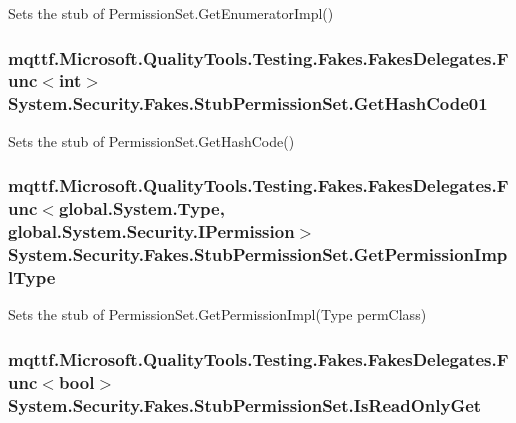 Sets the stub of Permission\-Set.\-Get\-Enumerator\-Impl()

\hypertarget{class_system_1_1_security_1_1_fakes_1_1_stub_permission_set_a9c2f0fec70925b817b46345404053334}{
\subsubsection[{Get\-Hash\-Code01}]{\setlength{\rightskip}{0pt plus 5cm}mqttf.\-Microsoft.\-Quality\-Tools.\-Testing.\-Fakes.\-Fakes\-Delegates.\-Func$<$int$>$ System.\-Security.\-Fakes.\-Stub\-Permission\-Set.\-Get\-Hash\-Code01}}\label{class_system_1_1_security_1_1_fakes_1_1_stub_permission_set_a9c2f0fec70925b817b46345404053334}


Sets the stub of Permission\-Set.\-Get\-Hash\-Code()

\hypertarget{class_system_1_1_security_1_1_fakes_1_1_stub_permission_set_a7f6a7fbaf260aecc82d9205c49b0a9bb}{
\subsubsection[{Get\-Permission\-Impl\-Type}]{\setlength{\rightskip}{0pt plus 5cm}mqttf.\-Microsoft.\-Quality\-Tools.\-Testing.\-Fakes.\-Fakes\-Delegates.\-Func$<$global.\-System.\-Type, global.\-System.\-Security.\-I\-Permission$>$ System.\-Security.\-Fakes.\-Stub\-Permission\-Set.\-Get\-Permission\-Impl\-Type}}\label{class_system_1_1_security_1_1_fakes_1_1_stub_permission_set_a7f6a7fbaf260aecc82d9205c49b0a9bb}


Sets the stub of Permission\-Set.\-Get\-Permission\-Impl(\-Type perm\-Class)

\hypertarget{class_system_1_1_security_1_1_fakes_1_1_stub_permission_set_a1bb769b58baec67379ac0daaf0825932}{
\subsubsection[{Is\-Read\-Only\-Get}]{\setlength{\rightskip}{0pt plus 5cm}mqttf.\-Microsoft.\-Quality\-Tools.\-Testing.\-Fakes.\-Fakes\-Delegates.\-Func$<$bool$>$ System.\-Security.\-Fakes.\-Stub\-Permission\-Set.\-Is\-Read\-Only\-Get}}\label{class_system_1_1_security_1_1_fakes_1_1_stub_permission_set_a1bb769b58baec67379ac0daaf0825932}


